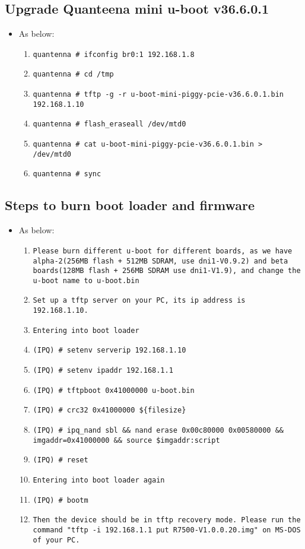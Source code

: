 \documentclass[12pt]{report}
\begin{document}
    \subsection{Upgrade Quanteena mini u-boot v36.6.0.1}
    \begin{itemize}
    \item As below:
    	\begin{enumerate}
		\item \texttt{quantenna \# ifconfig br0:1 192.168.1.8}
		\item \texttt{quantenna \# cd /tmp}
		\item \texttt{quantenna \# tftp -g -r u-boot-mini-piggy-pcie-v36.6.0.1.bin 192.168.1.10}
		\item \texttt{quantenna \# flash\_eraseall /dev/mtd0}
		\item \texttt{quantenna \# cat u-boot-mini-piggy-pcie-v36.6.0.1.bin > /dev/mtd0}
		\item \texttt{quantenna \# sync}
    	\end{enumerate}
    \end{itemize}

    \subsection{Steps to burn boot loader and firmware}
    \begin{itemize}
    \item As below:
            \begin{enumerate}
	    	\item \texttt{Please burn different u-boot for different boards, as we have alpha-2(256MB flash + 512MB SDRAM, use dni1-V0.9.2) and beta boards(128MB flash + 256MB SDRAM use dni1-V1.9), and change the u-boot name to u-boot.bin}
		\item \texttt{Set up a tftp server on your PC, its ip address is 192.168.1.10.}
		\item \texttt{Entering into boot loader}
		\item \texttt{(IPQ) \# setenv serverip 192.168.1.10}
		\item \texttt{(IPQ) \# setenv ipaddr 192.168.1.1}
		\item \texttt{(IPQ) \# tftpboot 0x41000000 u-boot.bin}
		\item \texttt{(IPQ) \# crc32 0x41000000 \$\{filesize\}}
		\item \texttt{(IPQ) \# ipq\_nand sbl \&\& nand erase 0x00c80000 0x00580000 \&\& imgaddr=0x41000000 \&\& source \$imgaddr:script}
		\item \texttt{(IPQ) \# reset}
		\item \texttt{Entering into boot loader again}
		\item \texttt{(IPQ) \# bootm}
		\item \texttt{Then the device should be in tftp recovery mode. Please run the command "tftp -i 192.168.1.1 put R7500-V1.0.0.20.img" on MS-DOS of your PC.}
            \end{enumerate}
    \end{itemize}
\end{document}
